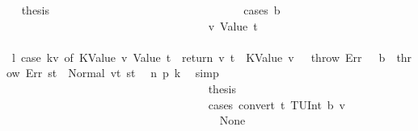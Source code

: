\begin{isabellebody}
\ \isamarkupfalse%
\ {\isacharquery}{\kern0pt}thesis\isanewline
\ \ \ \ \ \ \ \ \ \ \ \ \ \ \ \ \ \ \ \ \ \ \ \ \ \ \ \ \ \ \ \ \isamarkupfalse%
\ {\isacharparenleft}{\kern0pt}cases\ b{\isacharparenright}{\kern0pt}\isanewline
\ \ \ \ \ \ \ \ \ \ \ \ \ \ \ \ \ \ \ \ \ \ \ \ \ \ \ \ \ \ \ \ \ \ \isamarkupfalse%
\ v{\isacharcolon}{\kern0pt}\ {\isacharparenleft}{\kern0pt}Value\ t{\isacharparenright}{\kern0pt}\isanewline
\ \ \ \ \ \ \ \ \ \ \ \ \ \ \ \ \ \ \ \ \ \ \ \ \ \ \ \ \ \ \ \ \ \ \isamarkupfalse%
\ \isamarkupfalse%
\ l{}{\isacharcolon}{\kern0pt}\ {\isachardoublequoteopen}{\isacharparenleft}{\kern0pt}case\ kv\ of\ {\isacharparenleft}{\kern0pt}KValue\ v{\isacharcomma}{\kern0pt}\ Value\ t{\isacharparenright}{\kern0pt}\ {\isasymRightarrow}\ return\ {\isacharparenleft}{\kern0pt}v{\isacharcomma}{\kern0pt}\ t{\isacharparenright}{\kern0pt}\ {\isacharbar}{\kern0pt}\ {\isacharparenleft}{\kern0pt}KValue\ v{\isacharcomma}{\kern0pt}\ {\isacharunderscore}{\kern0pt}{\isacharparenright}{\kern0pt}\ {\isasymRightarrow}\ throw\ Err\ {\isacharbar}{\kern0pt}\ {\isacharparenleft}{\kern0pt}{\isacharunderscore}{\kern0pt}{\isacharcomma}{\kern0pt}\ b{\isacharparenright}{\kern0pt}\ {\isasymRightarrow}\ throw\ Err{\isacharparenright}{\kern0pt}\ st{\isacharprime}{\kern0pt}{\isacharprime}{\kern0pt}{\isacharprime}{\kern0pt}\ {\isacharequal}{\kern0pt}\ Normal\ {\isacharparenleft}{\kern0pt}{\isacharparenleft}{\kern0pt}v{\isacharcomma}{\kern0pt}t{\isacharparenright}{\kern0pt}{\isacharcomma}{\kern0pt}\ st{\isacharprime}{\kern0pt}{\isacharprime}{\kern0pt}{\isacharprime}{\kern0pt}{\isacharparenright}{\kern0pt}{\isachardoublequoteclose}\ \isamarkupfalse%
\ n{}\ p{}\ k{}\ \isamarkupfalse%
\ simp\isanewline
\ \ \ \ \ \ \ \ \ \ \ \ \ \ \ \ \ \ \ \ \ \ \ \ \ \ \ \ \ \ \ \ \ \ \isamarkupfalse%
\ {\isacharquery}{\kern0pt}thesis\isanewline
\ \ \ \ \ \ \ \ \ \ \ \ \ \ \ \ \ \ \ \ \ \ \ \ \ \ \ \ \ \ \ \ \ \ \isamarkupfalse%
\ {\isacharparenleft}{\kern0pt}cases\ {\isachardoublequoteopen}convert\ t\ {\isacharparenleft}{\kern0pt}TUInt\ b{}{}{}{\isacharparenright}{\kern0pt}\ v{\isachardoublequoteclose}{\isacharparenright}{\kern0pt}\isanewline
\ \ \ \ \ \ \ \ \ \ \ \ \ \ \ \ \ \ \ \ \ \ \ \ \ \ \ \ \ \ \ \ \ \ \ \ \isamarkupfalse%
\ None\isanewline
\ \ \ \ \ \ \ \ \ \ \ \ \ \ \ \ \ \ \ \ \ \ \ \ \ \ \ \ \ \ \ \ \ \ \ \ \isamarkupfalse%

\end{isabellebody}
